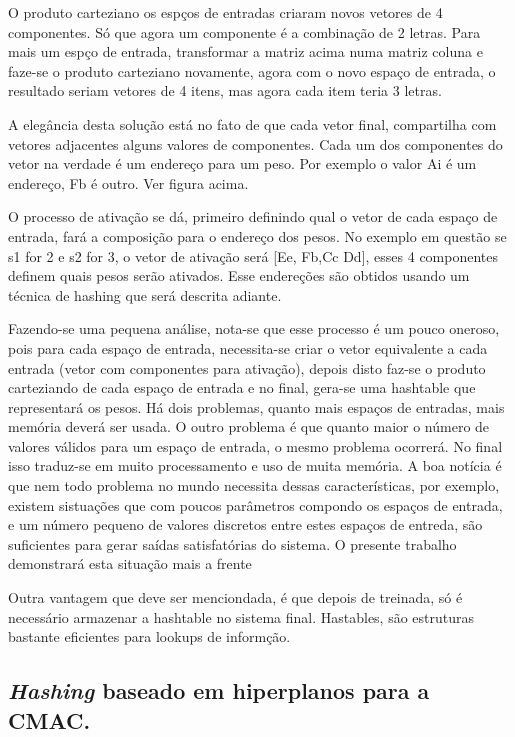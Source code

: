 \documentclass[a4paper, 12pt] {report}
\begin{document}
O produto carteziano os espços de entradas criaram novos vetores de 4 componentes. Só que agora um componente é a combinação de 2 letras. Para mais um espço de entrada, transformar a matriz acima numa matriz coluna e faze-se o produto carteziano novamente, agora com o novo espaço de entrada, o resultado seriam vetores de 4 itens, mas agora cada item teria 3 letras.

	A elegância desta solução está no fato de que cada vetor final, compartilha com vetores adjacentes alguns valores de componentes. Cada um dos componentes do vetor na verdade é um endereço para um peso. Por exemplo o valor Ai é um endereço, Fb é outro. Ver figura acima.

	O processo de ativação se dá, primeiro definindo qual o vetor de cada espaço de entrada, fará a composição para o endereço dos pesos. No exemplo em questão se s1 for 2 e s2 for 3, o vetor de ativação será [Ee, Fb,Cc Dd], esses 4 componentes definem quais pesos serão ativados. Esse endereções são obtidos usando um técnica de hashing que será descrita adiante.

	Fazendo-se uma pequena análise, nota-se que esse processo é um pouco oneroso, pois para cada espaço de entrada, necessita-se criar o vetor equivalente a cada entrada (vetor com componentes para ativação), depois disto faz-se o produto carteziando de cada espaço de entrada e no final, gera-se uma hashtable que representará os pesos. Há dois problemas, quanto mais espaços de entradas, mais memória deverá ser usada. O outro problema é que quanto maior o número de valores válidos para um espaço de entrada, o mesmo problema ocorrerá. No final isso traduz-se em muito processamento e uso de muita memória. A boa notícia é que nem todo problema no mundo necessita dessas características, por exemplo, existem sistuações que com poucos parâmetros compondo os espaços de entrada, e um número pequeno de valores discretos entre estes espaços de entreda, são suficientes para gerar saídas satisfatórias do sistema. O presente trabalho demonstrará esta situação mais a frente

Outra vantagem que deve ser menciondada, é que depois de treinada, só é necessário armazenar a hashtable no sistema final. Hastables, são estruturas bastante eficientes para lookups de informção.

			\subsection{\emph{Hashing} baseado em hiperplanos para a CMAC.}
\end{document}
